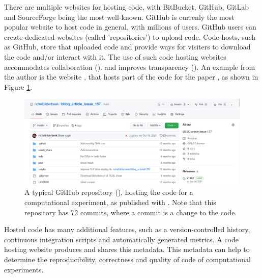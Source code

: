 
There are multiple websites for hosting code, with BitBucket, GitHub,
GitLab and SourceForge being the most well-known.
GitHub is currenly the most popular website to host code in general,
with millions of users.
GitHub users can create dedicated websites (called 'repositories')
to upload code. Code hosts, such as GitHub, 
store that uploaded code and provide ways 
for visiters to download the code and/or interact with it.
The use of such code hosting websites
accommodates collaboration (\cite{perez2016ten}).
and improves transparency (\cite{gorgolewski2016practical}).
An example from the author is the website \cite{bbbqarticleissue157},
that hosts part of the code for the paper \cite{bilderbeek2022transmembrane},
as shown in Figure \ref{fig:bbbqarticleissue157}.

\begin{figure}[!htbp]
  \centering
  \includegraphics[width=\linewidth]{bbbq_article_issue_157.png}
  \caption{
    A typical GitHub repository (\cite{bbbqarticleissue157}), 
    hosting the code for a
    computational experiment, 
    as published with \cite{bilderbeek2022transmembrane}.
    Note that this repository has 72 commits, where a commit is a change
    to the code.
  }
  \label{fig:bbbqarticleissue157}
\end{figure}


Hosted code has many additional features, such as
a version-controlled history, continuous integration scripts
and automatically generated metrics.
A code hosting website produces and shares this metadata.
This metadata can help to determine the
reproducibility, correctness and quality of code
of computational experiments.

